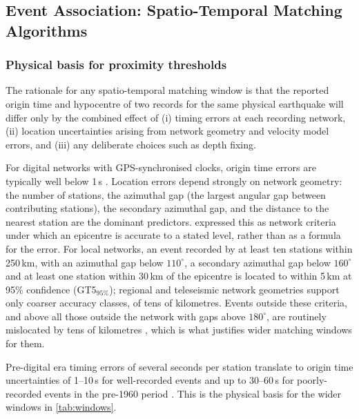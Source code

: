 \documentclass[12pt]{article}
\begin{document}
\subsection{Event Association: Spatio-Temporal Matching Algorithms}
\label{sec:matching}

\subsubsection{Physical basis for proximity thresholds}
\label{sec:physicalbasis}

The rationale for any spatio-temporal matching window is that the reported
origin time and hypocentre of two records for the same physical earthquake will
differ only by the combined effect of (i) timing errors at each recording
network, (ii) location uncertainties arising from network geometry and velocity
model errors, and (iii) any deliberate choices such as depth fixing.

For digital networks with GPS-synchronised clocks, origin time errors are
typically well below 1\,s \citep{Bondar2011}.  Location errors depend strongly
on network geometry: the number of stations, the azimuthal gap (the largest
angular gap between contributing stations), the secondary azimuthal gap, and
the distance to the nearest station are the dominant predictors.
\citet{Bondar2004} expressed this as network criteria under which an epicentre
is accurate to a stated level, rather than as a formula for the error.  For
local networks, an event recorded by at least ten stations within 250\,km, with
an azimuthal gap below $110^\circ$, a secondary azimuthal gap below $160^\circ$
and at least one station within 30\,km of the epicentre is located to within
5\,km at 95\% confidence (GT5$_{95\%}$); regional and teleseismic network
geometries support only coarser accuracy classes, of tens of kilometres.
Events outside these criteria, and above all those outside the network with
gaps above $180^\circ$, are routinely mislocated by tens of kilometres
\citep{Engdahl1998, Bondar2004}, which is what justifies wider matching windows
for them.

Pre-digital era timing errors of several seconds per station translate to origin
time uncertainties of 1--10\,s for well-recorded events and up to 30--60\,s for
poorly-recorded events in the pre-1960 period \citep{Bondar2011}.  This is the
physical basis for the wider windows in \cref{tab:windows}.
\end{document}
